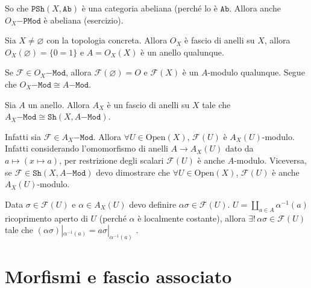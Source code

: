\begin{remark}{}
    So che \(\mathtt{PSh}{(X, \mathtt{Ab})}\) è una categoria abeliana (perché
    lo è \(\mathtt{Ab}\). Allora anche \(O_X\mathtt{-PMod}\) è abeliana
    (esercizio). 
\end{remark}

\begin{example}{}
    Sia \(X \neq \varnothing\) con la topologia concreta. Allora \(O_X\) è fascio
    di anelli su \(X\), allora \(O_X{(\varnothing)} = \{0=1\} \) e \(A =
    O_X{(X)}\) è un anello qualunque.
\end{example}

Se \(\mathcal{F} \in O_X\mathtt{-Mod}\), allora \(\mathcal{F}{(\varnothing)} =
O\) e \(\mathcal{F}{(X)}\) è un \(A\)-modulo qualunque. Segue che
\(O_X\mathtt{-Mod} \cong A\mathtt{-Mod}\). 

\begin{example}{}
    Sia \(A\) un anello. Allora \(A_X\) è un fascio di anelli su \(X\) tale che
    \(A_X\mathtt{-Mod}\cong \mathtt{Sh}{(X, A\mathtt{-Mod})}\).

    Infatti sia \(\mathcal{F} \in  A_X\mathtt{-Mod}\). Allora \(\forall U \in
    \mathrm{Open}{(X)}\), \(\mathcal{F}{(U)}\) è \(A_X{(U)}\)-modulo. Infatti
    considerando l'omomorfismo di anelli \(A \to A_X{(U)}\) dato da \(a \mapsto
    {(x \mapsto a)}\), per restrizione degli scalari \(\mathcal{F}{(U)}\) è
    anche \(A\)-modulo. Viceversa, se \(\mathcal{F} \in \mathtt{Sh}{(X,
    A\mathtt{-Mod})}\) devo dimostrare che \(\forall U \in
    \mathrm{Open}{(X)}\), \(\mathcal{F}{(U)}\) è anche \(A_X{(U)}\)-modulo.

    Data \(\sigma \in \mathcal{F}{(U)}\) e \(\alpha \in  A_X{(U)}\) devo
    definire \(\alpha \sigma \in  \mathcal{F}{(U)}\). \(U = \coprod_{a \in A}
    \alpha ^{-1}{(a)}\) ricoprimento aperto di \(U\) (perché \(\alpha\) è
    localmente costante), allora \(\exists ! \, \alpha \sigma \in
    \mathcal{F}{(U)}\) tale che \({(\alpha \sigma)}|_{\alpha^{-1}{(a)}} = a
    \sigma|_{\alpha^{-1}{(a)}}  \) .
\end{example}

\section{Morfismi e fascio associato}

